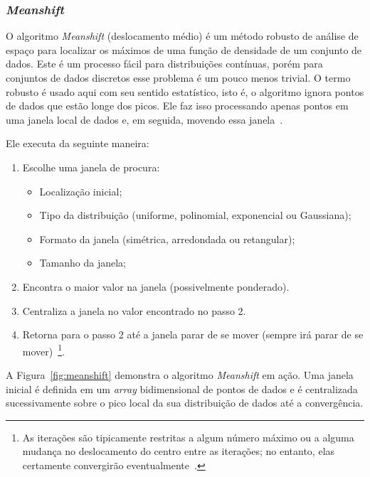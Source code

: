 \subsubsection{\textit{Meanshift}}
\label{subsubsec:meanshift}

O algoritmo \textit{Meanshift} (deslocamento médio) é um método robusto de análise de espaço para localizar os máximos de uma função de densidade de um conjunto de dados. Este é um processo fácil para distribuições contínuas, porém para conjuntos de dados discretos esse problema é um pouco menos trivial. O termo robusto é usado aqui com seu sentido estatístico, isto é, o algoritmo ignora pontos de dados que estão longe dos picos. Ele faz isso processando apenas pontos em uma janela local de dados e, em seguida, movendo essa janela~\cite{bradski2008learning}.

Ele executa da seguinte maneira:
\begin{enumerate}
    \item Escolhe uma janela de procura:
    \begin{itemize}
        \item Localização inicial;
        \item Tipo da distribuição (uniforme, polinomial, exponencial ou Gaussiana);
        \item Formato da janela (simétrica, arredondada ou retangular);
        \item Tamanho da janela;
    \end{itemize}
    \item Encontra o maior valor na janela (possivelmente ponderado).
    \item Centraliza a janela no valor encontrado no passo 2.
    \item Retorna para o passo 2 até a janela parar de se mover (sempre irá parar de se mover)~\footnote{As iterações são tipicamente restritas a algum número máximo ou a alguma mudança no deslocamento do centro entre as iterações; no entanto, elas certamente convergirão eventualmente~\cite{bradski2008learning}.}.
\end{enumerate}

A Figura~\ref{fig:meanshift} demonstra o algoritmo \textit{Meanshift} em ação. Uma janela inicial é definida em um \textit{array} bidimensional de pontos de dados e é centralizada sucessivamente sobre o pico local da sua distribuição de dados até a convergência.

